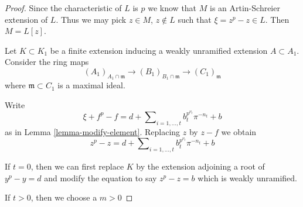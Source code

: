 \begin{proof}
Since the characteristic of $L$ is $p$ we know that $M$ is an Artin-Schreier
extension of $L$. Thus we may pick $z \in M$, $z \not \in L$ such that
$\xi = z^p - z \in L$. Then $M = L[z]$.

\medskip\noindent
Let $K \subset K_1$ be a finite extension inducing a weakly unramified
extension $A \subset A_1$. Consider the ring maps
$$
(A_1)_{A_1 \cap \mathfrak m} \to
(B_1)_{B_1 \cap \mathfrak m} \to
(C_1)_\mathfrak m
$$
where $\mathfrak m \subset C_1$ is a maximal ideal.

\medskip\noindent
Write
$$
\xi + f^p - f =
d + \sum\nolimits_{i = 1, \ldots, t} b_t^{p^{\nu_t}} \pi^{-n_t} + b
$$
as in Lemma \ref{lemma-modify-element}. Replacing $z$ by $z - f$ we
obtain
$$
z^p - z = d + \sum\nolimits_{i = 1, \ldots, t} b_t^{p^{\nu_t}} \pi^{-n_t} + b
$$

\medskip\noindent
If $t = 0$, then we can first
replace $K$ by the extension adjoining a root of $y^p - y = d$
and modify the equation to say $z^p - z = b$ which is weakly unramified.

\medskip\noindent
If $t > 0$, then we choose a $m > 0$

\end{proof}













